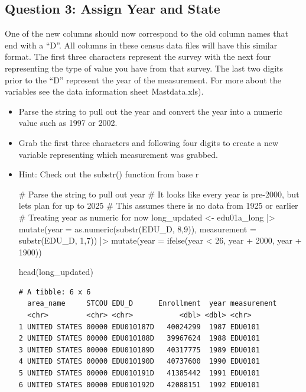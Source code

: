 \documentclass[
  letterpaper,
  DIV=11,
  numbers=noendperiod]{scrartcl}
\newenvironment{Shaded}{\begin{snugshade}}{\end{snugshade}}
\newcommand{\AttributeTok}[1]{\textcolor[rgb]{0.40,0.45,0.13}{#1}}
\newcommand{\CommentTok}[1]{\textcolor[rgb]{0.37,0.37,0.37}{#1}}
\newcommand{\DecValTok}[1]{\textcolor[rgb]{0.68,0.00,0.00}{#1}}
\newcommand{\FunctionTok}[1]{\textcolor[rgb]{0.28,0.35,0.67}{#1}}
\newcommand{\NormalTok}[1]{\textcolor[rgb]{0.00,0.23,0.31}{#1}}
\newcommand{\OtherTok}[1]{\textcolor[rgb]{0.00,0.23,0.31}{#1}}
\newcommand{\SpecialCharTok}[1]{\textcolor[rgb]{0.37,0.37,0.37}{#1}}
\begin{document}
\subsection{Question 3: Assign Year and
State}\label{question-3-assign-year-and-state}

One of the new columns should now correspond to the old column names
that end with a ``D''. All columns in these census data files will have
this similar format. The first three characters represent the survey
with the next four representing the type of value you have from that
survey. The last two digits prior to the ``D'' represent the year of the
measurement. For more about the variables see the data information sheet
Mastdata.xls).

\begin{itemize}
\item
  Parse the string to pull out the year and convert the year into a
  numeric value such as 1997 or 2002.
\item
  Grab the first three characters and following four digits to create a
  new variable representing which measurement was grabbed.
\item
  Hint: Check out the substr() function from base r

\begin{Shaded}
\begin{Highlighting}[]
\CommentTok{\# Parse the string to pull out year}
\CommentTok{\# It looks like every year is pre{-}2000, but let\textquotesingle{}s plan for up to 2025}
\CommentTok{\# This assumes there is no data from 1925 or earlier}
\CommentTok{\# Treating year as numeric for now}
\NormalTok{long\_updated }\OtherTok{\textless{}{-}}\NormalTok{ edu01a\_long }\SpecialCharTok{|\textgreater{}} \FunctionTok{mutate}\NormalTok{(}\AttributeTok{year =} \FunctionTok{as.numeric}\NormalTok{(}\FunctionTok{substr}\NormalTok{(EDU\_D, }\DecValTok{8}\NormalTok{,}\DecValTok{9}\NormalTok{)), }
  \AttributeTok{measurement =} \FunctionTok{substr}\NormalTok{(EDU\_D, }\DecValTok{1}\NormalTok{,}\DecValTok{7}\NormalTok{)) }\SpecialCharTok{|\textgreater{}} 
  \FunctionTok{mutate}\NormalTok{(}\AttributeTok{year =} \FunctionTok{ifelse}\NormalTok{(year }\SpecialCharTok{\textless{}} \DecValTok{26}\NormalTok{, year }\SpecialCharTok{+} \DecValTok{2000}\NormalTok{, year }\SpecialCharTok{+} \DecValTok{1900}\NormalTok{))}

\FunctionTok{head}\NormalTok{(long\_updated)}
\end{Highlighting}
\end{Shaded}

\begin{verbatim}
# A tibble: 6 x 6
  area_name     STCOU EDU_D      Enrollment  year measurement
  <chr>         <chr> <chr>           <dbl> <dbl> <chr>      
1 UNITED STATES 00000 EDU010187D   40024299  1987 EDU0101    
2 UNITED STATES 00000 EDU010188D   39967624  1988 EDU0101    
3 UNITED STATES 00000 EDU010189D   40317775  1989 EDU0101    
4 UNITED STATES 00000 EDU010190D   40737600  1990 EDU0101    
5 UNITED STATES 00000 EDU010191D   41385442  1991 EDU0101    
6 UNITED STATES 00000 EDU010192D   42088151  1992 EDU0101    
\end{verbatim}
\end{itemize}
\end{document}
